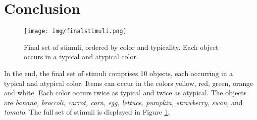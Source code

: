 \documentclass[a4paper,man,floatsintext,natbib,donotrepeattitle]{apa6}
\begin{document}
\section{Conclusion}

\begin{figure}
	\texttt{[image: img/finalstimuli.png]}
	\caption{Final set of stimuli, ordered by color and typicality. Each object occurs in a typical and atypical color.}
	\label{fig:finalstimuli}
\end{figure}

In the end, the final set of stimuli comprises 10 objects, each occurring in a typical and atypical color.
Items can occur in the colors yellow, red, green, orange and white. Each color occurs twice as typical and twice as atypical. The objects are \textit{banana, broccoli, carrot, corn, egg, lettuce, pumpkin, strawberry, swan,} and \textit{tomato}. The full set of stimuli is displayed in Figure \ref{fig:finalstimuli}.





\vfill
\pagebreak
\end{document}
